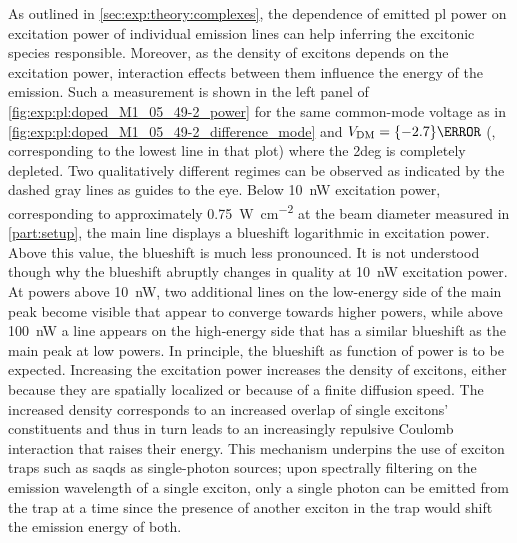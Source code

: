 As outlined in \cref{sec:exp:theory:complexes}, the dependence of emitted \gls{pl} power on excitation power of individual emission lines can help inferring the excitonic species responsible.
Moreover, as the density of excitons depends on the excitation power, interaction effects between them influence the energy of the emission.
Such a measurement is shown in the left panel of \cref{fig:exp:pl:doped_M1_05_49-2_power} for the same common-mode voltage as in \cref{fig:exp:pl:doped_M1_05_49-2_difference_mode} and $\VDM = \qty{-2.7}{\volt}$ (\ie, corresponding to the lowest line in that plot) where the \gls{2deg} is completely depleted.
Two qualitatively different regimes can be observed as indicated by the dashed gray lines as guides to the eye.
Below \qty{10}{\nano\watt} excitation power, corresponding to approximately \qty{0.75}{\watt\per\square\centi\meter} at the beam diameter measured in \cref{part:setup}, the main line displays a blueshift logarithmic in excitation power.
Above this value, the blueshift is much less pronounced.
It is not understood though why the blueshift abruptly changes in quality at \qty{10}{\nano\watt} excitation power.
At powers above \qty{10}{\nano\watt}, two additional lines on the low-energy side of the main peak become visible that appear to converge towards higher powers, while above \qty{100}{\nano\watt} a line appears on the high-energy side that has a similar blueshift as the main peak at low powers.
In principle, the blueshift as function of power is to be expected.
Increasing the excitation power increases the density of excitons, either because they are spatially localized or because of a finite diffusion speed.
The increased density corresponds to an increased overlap of single excitons' constituents and thus in turn leads to an increasingly repulsive Coulomb interaction that raises their energy.
This mechanism underpins the use of exciton traps such as \glspl{saqd} as single-photon sources; upon spectrally filtering on the emission wavelength of a single exciton, only a single photon can be emitted from the trap at a time since the presence of another exciton in the trap would shift the emission energy of both. %

